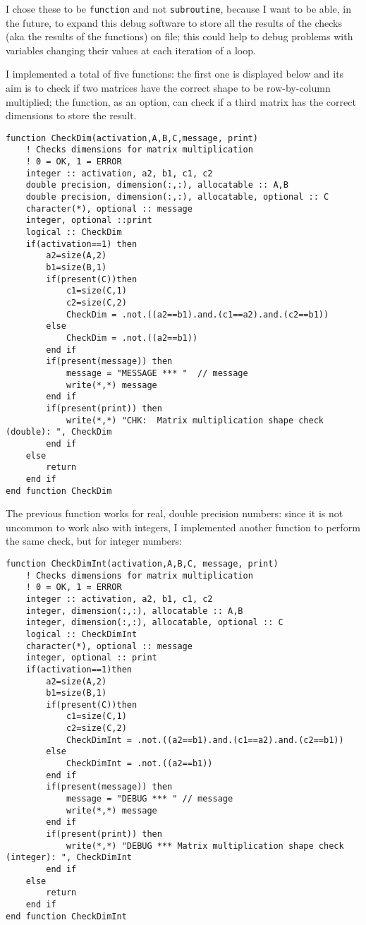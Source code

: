 \documentclass[a4paper]{article}
\begin{document}
\noindent I chose these to be \lstinline{function} and not \lstinline{subroutine}, because I want to be able, in the future, to expand this debug software to store all the results of the checks (aka the results of the functions) on file; this could help to debug problems with variables changing their values at each iteration of a loop.

\medskip
I implemented a total of five functions: the first one is displayed below and its aim is to check if two matrices have the correct shape to be row-by-column multiplied; the function, as an option, can check if a third matrix has the correct dimensions to store the result.



\begin{lstlisting}
function CheckDim(activation,A,B,C,message, print)
    ! Checks dimensions for matrix multiplication
    ! 0 = OK, 1 = ERROR
    integer :: activation, a2, b1, c1, c2
    double precision, dimension(:,:), allocatable :: A,B
    double precision, dimension(:,:), allocatable, optional :: C
    character(*), optional :: message
    integer, optional ::print
    logical :: CheckDim
    if(activation==1) then
        a2=size(A,2)
        b1=size(B,1)
        if(present(C))then
            c1=size(C,1)
            c2=size(C,2)
            CheckDim = .not.((a2==b1).and.(c1==a2).and.(c2==b1))
        else
            CheckDim = .not.((a2==b1))
        end if
        if(present(message)) then
            message = "MESSAGE *** "  // message
            write(*,*) message
        end if
        if(present(print)) then
            write(*,*) "CHK:  Matrix multiplication shape check (double): ", CheckDim
        end if
    else
        return
    end if
end function CheckDim
\end{lstlisting}

\noindent The previous function works for real, double precision numbers: since it is not uncommon to work also with integers, I implemented another function to perform the same check, but for integer numbers:
\begin{lstlisting}
function CheckDimInt(activation,A,B,C, message, print)
    ! Checks dimensions for matrix multiplication
    ! 0 = OK, 1 = ERROR
    integer :: activation, a2, b1, c1, c2
    integer, dimension(:,:), allocatable :: A,B
    integer, dimension(:,:), allocatable, optional :: C
    logical :: CheckDimInt
    character(*), optional :: message
    integer, optional :: print
    if(activation==1)then
        a2=size(A,2)
        b1=size(B,1)
        if(present(C))then
            c1=size(C,1)
            c2=size(C,2)
            CheckDimInt = .not.((a2==b1).and.(c1==a2).and.(c2==b1))
        else
            CheckDimInt = .not.((a2==b1))
        end if
        if(present(message)) then
            message = "DEBUG *** " // message
            write(*,*) message
        end if
        if(present(print)) then
            write(*,*) "DEBUG *** Matrix multiplication shape check (integer): ", CheckDimInt
        end if
    else 
        return
    end if
end function CheckDimInt
\end{lstlisting}
\end{document}
